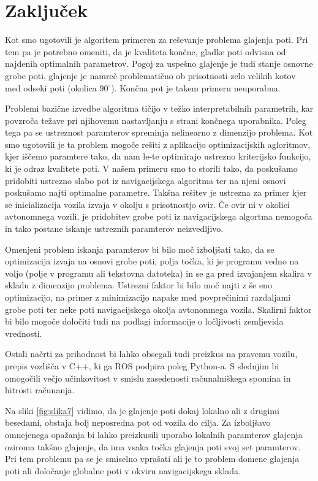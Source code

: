 \documentclass[10pt,a4paper]{article}
\begin{document}
\section{Zaključek}

Kot smo ugotovili je algoritem primeren za reševanje problema glajenja poti. Pri tem pa je potrebno omeniti, da je kvaliteta končne, gladke poti odvisna od najdenih optimalnih parametrov. Pogoj za uspešno glajenje je tudi stanje osnovne grobe poti, glajenje je namreč problematično ob prisotnosti zelo velikih kotov med odseki poti (okolica $90^{\circ}$). Končna pot je takem primeru neuporabna.

Problemi bazične izvedbe algoritma tičijo v težko interpretabilnih parametrih, kar povzroča težave pri njihovemu nastavljanju s strani končnega uporabnika. Poleg tega pa se ustreznost paramterov spreminja nelinearno z dimenzijo problema. Kot smo ugotovili je ta problem mogoče rešiti z aplikacijo optimizacijskih agloritmov, kjer iščemo paramtere tako, da nam le-te optimirajo ustrezno kriterijsko funkcijo, ki je odraz kvalitete poti. V našem primeru smo to storili tako, da poskušamo pridobiti ustrezno slabo pot iz navigacijskega algoritma ter na njeni osnovi poskušamo najti optimalne parametre. Takšna rešitev je ustrezna za primer kjer se inicializacija vozila izvaja v okolju s prisotnostjo ovir. Če ovir ni v okolici avtonomnega vozili, je pridobitev grobe poti iz navigacijskega algortma nemogoča in tako postane iskanje ustreznih paramterov neizvedljivo.

Omenjeni problem iskanja paramterov bi bilo moč izboljšati tako, da se optimizacija izvaja na osnovi grobe poti, polja točka, ki je programu vedno na voljo (polje v programu ali tekstovna datoteka) in se ga pred izvajanjem skalira v skladu z dimenzijo problema. Ustrezni faktor bi bilo moč najti z še eno optimizacijo, na primer z minimizacijo napake med povprečinimi razdaljami grobe poti ter neke poti navigacijskega okolja avtonomnega vozila. Skalirni faktor bi bilo mogoče določiti tudi na podlagi informacije o ločljivosti zemljevida vrednosti.

Ostali načrti za prihodnost bi lahko obsegali tudi preizkus na pravemu vozilu, prepis vozlišča v C++, ki ga ROS podpira poleg Python-a. S slednjim bi omogočili večjo učinkovitost v smislu zasedenosti računalniškega spomina in hitrosti računanja. 

Na sliki \ref{fig:slika7} vidimo, da je glajenje poti dokaj lokalno ali z drugimi besedami, obstaja bolj neposredna pot od vozila do cilja. Za izboljšavo omnejenega opažanja bi lahko preizkusili uporabo lokalnih paramterov glajenja oziroma takšno glajenje, da ima vsaka točka glajenja poti svoj set paramterov. Pri tem problemu pa se je smiselno vprašati ali je to problem domene glajenja poti ali določanje globalne poti v okviru navigacijskega sklada.
\end{document}
